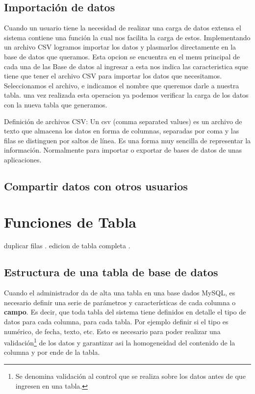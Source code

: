 \documentclass[a4paper,10pt]{article}
\begin{document}
\subsection{Importación de datos}
Cuando un usuario tiene la necesidad de realizar una carga de datos extensa el sistema contiene una función la cual nos facilita la carga de estos. Implementando un archivo CSV logramos importar los datos y plasmarlos directamente en la base de datos que queramos.
Esta opcion se encuentra en el menu principal de cada una de las Base de datos  al ingresar a esta nos indica las caracteristica sque tiene que tener el archivo CSV para importar los datos que necesitamos. Seleccionamos el archivo, e indicamos el nombre que queremos darle a nuestra tabla. una vez realizada esta operacion ya podemos verificar la carga de los datos con la nueva tabla que generamos.

Definición de archivos CSV: Un csv (comma separated values) es un archivo de texto que almacena los datos en forma de columnas, separadas por coma y las filas se distinguen por saltos de línea. Es una forma muy sencilla de representar la información. Normalmente para importar o exportar de bases de datos de unas aplicaciones.


\subsection{Compartir datos con otros usuarios}


\section{Funciones de Tabla}
duplicar filas .
edicion de tabla completa .



\subsection{Estructura de una tabla de base de datos}

Cuando el administrador da de alta una tabla en una base dados MySQL, es necesario definir una serie de parámetros y características de cada columna o \textbf{campo}. Es decir, que toda tabla del sistema tiene definidos en detalle el tipo de datos para cada columna, para cada tabla. Por ejemplo definir si el tipo es numérico, de fecha, texto, etc. Esto es necesario para poder realizar una validación\footnote{Se denomina validación al control que se realiza sobre los datos antes de que ingresen en una tabla.} de los datos y garantizar asi la homogeneidad del contenido de la columna y por ende de la tabla.
\end{document}
